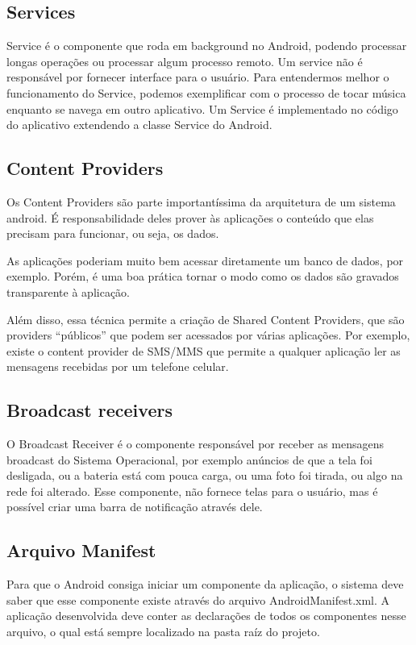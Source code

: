 \documentclass[12pt, %
openright, 
oneside,
a4paper,
brazil]{facom-ufu-abntex2}
\begin{document}
	\subsection{Services}
	Service é o componente que roda em background no Android, podendo processar longas operações ou processar algum processo remoto. Um service não é responsável por fornecer interface para o usuário. Para entendermos melhor o funcionamento do Service, podemos exemplificar com o processo de tocar música enquanto se navega em outro aplicativo.
	Um Service é implementado no código do aplicativo extendendo a classe Service do Android.
	
	\subsection{Content Providers}
	Os Content Providers são parte importantíssima da arquitetura de um sistema android. É responsabilidade deles prover às aplicações o conteúdo que elas precisam para funcionar, ou seja, os dados.

As aplicações poderiam muito bem acessar diretamente um banco de dados, por exemplo. Porém, é uma boa prática tornar o modo como os dados são gravados transparente à aplicação. 

Além disso, essa técnica permite a criação de Shared Content Providers, que são providers “públicos” que podem ser acessados por várias aplicações. Por exemplo, existe o content provider de SMS/MMS que permite a qualquer aplicação ler as mensagens recebidas por um telefone celular.

	\subsection{Broadcast receivers}
	O Broadcast Receiver é o componente responsável por receber as mensagens broadcast do Sistema Operacional, por exemplo anúncios de que a tela foi desligada, ou a bateria está com pouca carga, ou uma foto foi tirada, ou algo na rede foi alterado. Esse componente, não fornece telas para o usuário, mas é possível criar uma barra de notificação através dele.

	\subsection{Arquivo Manifest}
	Para que o Android consiga iniciar um componente da aplicação, o sistema deve saber que esse componente existe através do arquivo AndroidManifest.xml. A aplicação desenvolvida deve conter as declarações de todos os componentes nesse arquivo, o qual está sempre localizado na pasta raíz do projeto.		
\end{document}
